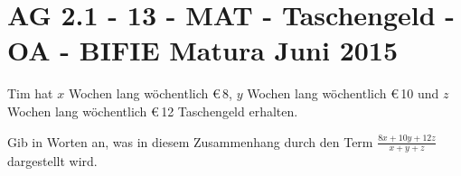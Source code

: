\section{AG 2.1 - 13 - MAT - Taschengeld - OA - BIFIE Matura Juni 2015}

\begin{beispiel}[AG 2.1]{1} %
Tim hat $x$ Wochen lang wöchentlich \euro\,8, $y$ Wochen lang wöchentlich \euro\,10 und $z$ Wochen lang
wöchentlich \euro\,12 Taschengeld erhalten. \leer

Gib in Worten an, was in diesem Zusammenhang durch den Term $\frac{8x + 10y +12z}{x+y+z}$ dargestellt wird.

\end{beispiel}